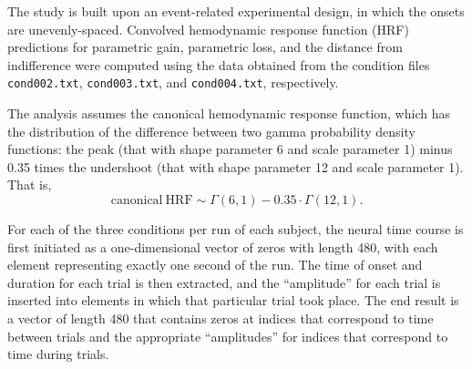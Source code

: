 
\par The study is built upon an event-related experimental design, in which the
onsets are unevenly-spaced. Convolved hemodynamic response function (HRF)
predictions for parametric gain, parametric loss, and the distance from
indifference were computed using the data obtained from the condition files
\texttt{cond002.txt}, \texttt{cond003.txt}, and \texttt{cond004.txt},
respectively.

\par \indent The analysis assumes the canonical hemodynamic response function,
which has the distribution of the difference between two gamma probability
density functions: the peak (that with shape parameter 6 and scale parameter 1)
minus 0.35 times the undershoot (that with shape parameter 12 and scale
parameter 1). That is,
\[
\mathrm{ canonical \ HRF } \sim \Gamma \left( 6 , 1 \right) - 0.35 \cdot \Gamma
\left( 12 , 1 \right).
\]

\par \indent For each of the three conditions per run of each subject, the
neural time course is first initiated as a one-dimensional vector of zeros with
length 480, with each element representing exactly one second of the run. The
time of onset and duration for each trial is then extracted, and the
``amplitude'' for each trial is inserted into elements in which that particular
trial took place. The end result is a vector of length 480 that contains zeros
at indices that correspond to time between trials and the appropriate
``amplitudes'' for indices that correspond to time during trials.
